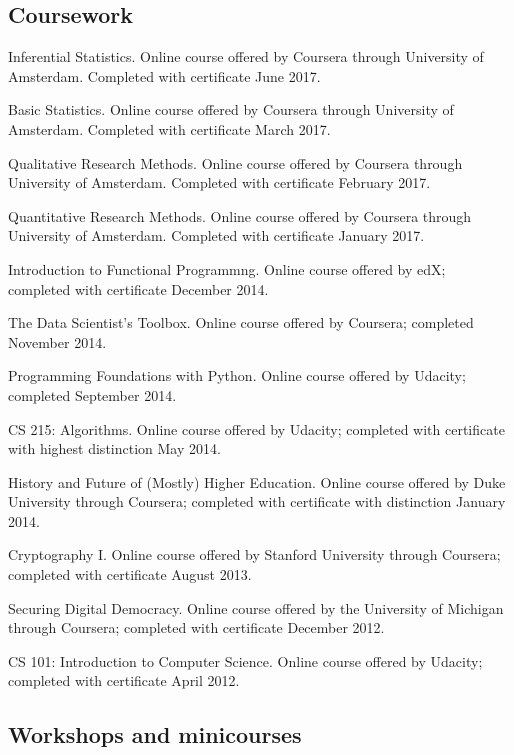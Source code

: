 \documentclass[letterpaper]{article}
\renewenvironment{itemize}{
  \begin{list}{}{
    \setlength{\leftmargin}{1.5em}
	\setlength{\itemsep}{0in}
  }
}{
  \end{list}
}
\begin{document}
\subsection*{Coursework}
\begin{itemize}
	\item Inferential Statistics. Online course offered by Coursera through University of Amsterdam. Completed with certificate June 2017.
	\item Basic Statistics. Online course offered by Coursera through University of Amsterdam. Completed with certificate March 2017.
	\item Qualitative Research Methods. Online course offered by Coursera through University of Amsterdam. Completed with certificate February 2017.
	\item Quantitative Research Methods. Online course offered by Coursera through University of Amsterdam. Completed with certificate January 2017.
	\item Introduction to Functional Programmng. Online course offered by edX; completed with certificate December 2014.
	\item The Data Scientist's Toolbox. Online course offered by Coursera; completed November 2014. 
	\item Programming Foundations with Python. Online course offered by Udacity; completed September 2014. 
	\item CS 215: Algorithms. Online course offered by Udacity; completed with certificate with highest distinction May 2014.  
	\item History and Future of (Mostly) Higher Education. Online course offered by Duke University through Coursera; completed with certificate with distinction January 2014. 
	\item Cryptography I. Online course offered by Stanford University through Coursera; completed with certificate August 2013. 
	\item Securing Digital Democracy. Online course offered by the University of Michigan through Coursera; completed with certificate December 2012.
	\item CS 101: Introduction to Computer Science. Online course offered by Udacity; completed with certificate April 2012. 
\end{itemize}


\subsection*{Workshops and minicourses}
\end{document}
